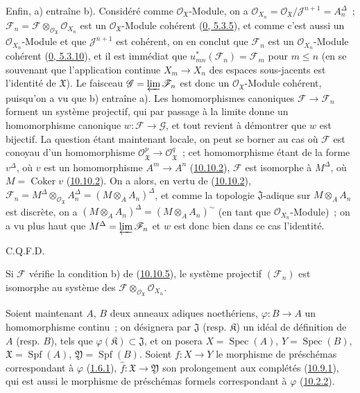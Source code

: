 Enfin, a) entraîne b). Considéré comme
$\mathscr{O}_{\mathfrak{X}}$-Module, on a
$\mathscr{O}_{X_n}=\mathscr{O}_{\mathfrak{X}}/
\mathscr{J}^{n+1}=A_n^\Delta$~; $\mathscr{F}_n=\mathscr{F}
\otimes_{\mathscr{O}_{\mathfrak{X}}}\mathscr{O}_{X_n}$ est un
$\mathscr{O}_{\mathfrak{X}}$-Module cohérent
(\hyperref[0.5.3.5-fr]{0, 5.3.5}), et comme c'est aussi un
$\mathscr{O}_{X_n}$-Module et que $\mathscr{J}^{n+1}$ est cohérent,
on en conclut que $\mathscr{F}_n$ est un
$\mathscr{O}_{X_n}$-Module cohérent
(\hyperref[0.5.3.10-fr]{0, 5.3.10}), et il est immédiat que
$u_{mn}^*(\mathscr{F}_n)=\mathscr{F}_m$ pour $m\leq n$ (en se
souvenant que l'application continue $X_m\to X_n$ des espaces
sous-jacents est l'identité de $\mathfrak{X}$). Le faisceau
$\mathscr{G}=\varprojlim\mathscr{F}_n$ est donc un
$\mathscr{O}_{\mathfrak{X}}$-Module cohérent, puisqu'on a vu que b)
entraîne a). Les homomorphismes canoniques
$\mathscr{F}\to\mathscr{F}_n$ forment un système projectif, qui par
passage à la limite donne un homomorphisme canonique
$w:\mathscr{F}\to\mathscr{G}$, et tout revient à démontrer que $w$ est
bijectif. La question étant maintenant locale, on peut se borner au cas
où $\mathscr{F}$ est conoyau d'un homomorphisme
$\mathscr{O}_{\mathfrak{X}}^p\to\mathscr{O}_{\mathfrak{X}}^q$~; cet
homomorphisme étant de la forme $v^\Delta$, où $v$ est un homomorphisme
$A^m\to A^n$ (\hyperref[I.10.10.2-fr]{10.10.2}), $\mathscr{F}$ est
isomorphe à $M^\Delta$, où $M=\operatorname{Coker}v$
(\hyperref[I.10.10.2-fr]{10.10.2}). On a alors, en vertu de
(\hyperref[I.10.10.2-fr]{10.10.2}),
$\mathscr{F}_n=M^\Delta\otimes_{\mathscr{O}_{\mathfrak{X}}}A_n^\Delta
=(M\otimes_A A_n)^\Delta$, et comme la topologie $\mathfrak{J}$-adique
sur $M\otimes_A A_n$ est discrète, on a
$(M\otimes_A A_n)^\Delta=(M\otimes_A A_n)^{\sim}$ (en tant que
$\mathscr{O}_{X_n}$-Module)~; on a vu plus haut que
$M^\Delta=\varprojlim\mathscr{F}_n$ et $w$ est donc bien dans ce cas
l'identité.
\par\hfill C.Q.F.D.\par

\begin{corollary}[10.10.6]
\label{I.10.10.6-fr}
Si $\mathscr{F}$ vérifie la condition b) de
(\hyperref[I.10.10.5-fr]{10.10.5}), le système projectif
$(\mathscr{F}_n)$ est isomorphe au système des
$\mathscr{F}\otimes_{\mathscr{O}_{\mathfrak{X}}}\mathscr{O}_{X_n}$.
\end{corollary}

\begin{env}[10.10.7]
\label{I.10.10.7-fr}
Soient maintenant $A$, $B$ deux anneaux adiques noethériens,
$\varphi:B\to A$ un homomorphisme continu~; on désignera par
$\mathfrak{J}$ (resp. $\mathfrak{K}$) un idéal de définition de $A$
(resp. $B$), tels que $\varphi(\mathfrak{K})\subset\mathfrak{J}$, et
on posera $X=\operatorname{Spec}(A)$, $Y=\operatorname{Spec}(B)$,
$\mathfrak{X}=\operatorname{Spf}(A)$,
$\mathfrak{Y}=\operatorname{Spf}(B)$. Soient $f:X\to Y$ le morphisme
de préschémas correspondant à $\varphi$
(\hyperref[I.1.6.1-fr]{1.6.1}), $\widehat f:\mathfrak{X}\to
\mathfrak{Y}$ son prolongement aux complétés
(\hyperref[I.10.9.1-fr]{10.9.1}), qui est aussi le morphisme de
préschémas formels correspondant à $\varphi$
(\hyperref[I.10.2.2-fr]{10.2.2}).
\end{env}


